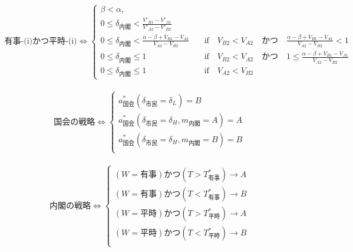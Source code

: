 \documentclass[main.tex]{subfiles}
\begin{document}
\begin{align*}
    \text{有事-(i)かつ平時-(i)} \Leftrightarrow 
    \begin{cases}
        \beta < \alpha, \\
        0 \le \delta_{内閣} < \frac{V'_{B1}-V'_{A1}}{V'_{A2} - V'_{B2}}\\
        0 \le \delta_{内閣} < \frac{\alpha-\beta + V_{B1}-V_{A1}}{V_{A2} - V_{B2}} \quad&\text{if}\quad V_{B2} < V_{A2} \quad{かつ}\quad \frac{\alpha-\beta + V_{B1}-V_{A1}}{V_{A2} - V_{B2}}<1\\
        0 \le \delta_{内閣} \le 1 \quad&\text{if}\quad V_{B2} < V_{A2} \quad{かつ}\quad 1 \le \frac{\alpha-\beta + V_{B1}-V_{A1}}{V_{A2} - V_{B2}}\\
        0 \le \delta_{内閣} \le 1 \quad&\text{if}\quad V_{A2} < V_{B2}
    \end{cases}
\end{align*}


\begin{align*}
    \text{国会の戦略} \Leftrightarrow 
    \begin{cases}
        a^*_{国会}(\delta_{市民}=\delta_L) = B \\[0.5em]
        a^*_{国会}(\delta_{市民}=\delta_H, m_{内閣} = A) = A \\[0.5em]
        a^*_{国会}(\delta_{市民}=\delta_H, m_{内閣} = B) = B \\[0.5em]
     \end{cases}
\end{align*}

\begin{align*}
    \text{内閣の戦略} \Leftrightarrow 
    \begin{cases}
        (W=有事) かつ (T>T^*_{有事})  \rightarrow A\\
        (W=有事) かつ (T<T^*_{有事})  \rightarrow B\\
        (W=平時) かつ (T>T^*_{平時})  \rightarrow A\\
        (W=平時) かつ (T<T^*_{平時})   \rightarrow B\\
    \end{cases}
\end{align*}
\end{document}
